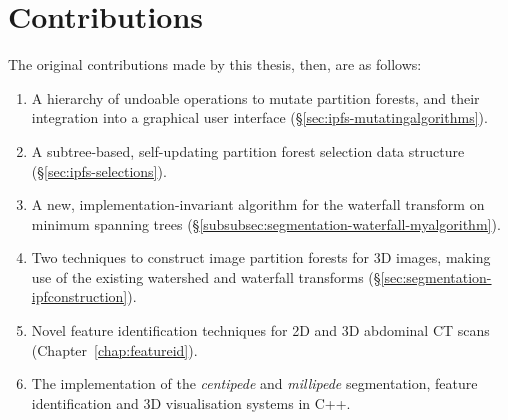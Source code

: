 \vspace{-\baselineskip}
\enlargethispage*{\baselineskip}

\section*{Contributions}


The original contributions made by this thesis, then, are as follows:

\begin{enumerate}
\item A hierarchy of undoable operations to mutate partition forests, and their integration into a graphical user interface (\S\ref{sec:ipfs-mutatingalgorithms}).
\item A subtree-based, self-updating partition forest selection data structure (\S\ref{sec:ipfs-selections}).
\item A new, implementation-invariant algorithm for the waterfall transform on minimum spanning trees (\S\ref{subsubsec:segmentation-waterfall-myalgorithm}).
\item Two techniques to construct image partition forests for 3D images, making use of the existing watershed and waterfall transforms (\S\ref{sec:segmentation-ipfconstruction}).
\item Novel feature identification techniques for 2D and 3D abdominal CT scans (Chapter~\ref{chap:featureid}).
\item The implementation of the \emph{centipede} and \emph{millipede} segmentation, feature identification and 3D visualisation systems in C++.
\end{enumerate}


